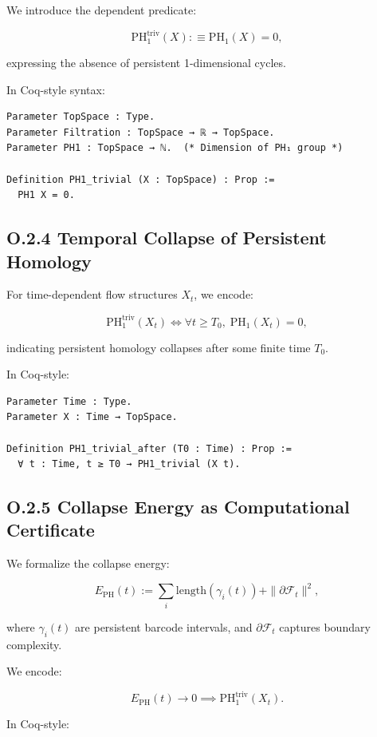 \documentclass[11pt]{article}
\begin{document}
We introduce the dependent predicate:

\[
\mathrm{PH}_1^{\mathrm{triv}}(X) :\equiv \mathrm{PH}_1(X) = 0,
\]

expressing the absence of persistent 1-dimensional cycles.

In Coq-style syntax:

\begin{lstlisting}[language=Coq]
Parameter TopSpace : Type.
Parameter Filtration : TopSpace → ℝ → TopSpace.
Parameter PH1 : TopSpace → ℕ.  (* Dimension of PH₁ group *)

Definition PH1_trivial (X : TopSpace) : Prop :=
  PH1 X = 0.
\end{lstlisting}

\subsection*{O.2.4 Temporal Collapse of Persistent Homology}

For time-dependent flow structures \( X_t \), we encode:

\[
\mathrm{PH}_1^{\mathrm{triv}}(X_t) \iff \forall t \geq T_0,\; \mathrm{PH}_1(X_t) = 0,
\]

indicating persistent homology collapses after some finite time \( T_0 \).

In Coq-style:

\begin{lstlisting}[language=Coq]
Parameter Time : Type.
Parameter X : Time → TopSpace.

Definition PH1_trivial_after (T0 : Time) : Prop :=
  ∀ t : Time, t ≥ T0 → PH1_trivial (X t).
\end{lstlisting}

\subsection*{O.2.5 Collapse Energy as Computational Certificate}

We formalize the collapse energy:

\[
E_{\mathrm{PH}}(t) := \sum_i \mathrm{length}(\gamma_i(t)) + \|\partial \mathcal{F}_t\|^2,
\]

where \( \gamma_i(t) \) are persistent barcode intervals, and \( \partial \mathcal{F}_t \) captures boundary complexity.

We encode:

\[
E_{\mathrm{PH}}(t) \to 0 \implies \mathrm{PH}_1^{\mathrm{triv}}(X_t).
\]

In Coq-style:
\end{document}
